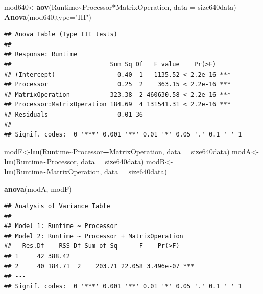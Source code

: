 \documentclass[
]{article}
\newenvironment{Shaded}{\begin{snugshade}}{\end{snugshade}}
\newcommand{\DataTypeTok}[1]{\textcolor[rgb]{0.13,0.29,0.53}{#1}}
\newcommand{\KeywordTok}[1]{\textcolor[rgb]{0.13,0.29,0.53}{\textbf{#1}}}
\newcommand{\NormalTok}[1]{#1}
\newcommand{\OperatorTok}[1]{\textcolor[rgb]{0.81,0.36,0.00}{\textbf{#1}}}
\newcommand{\StringTok}[1]{\textcolor[rgb]{0.31,0.60,0.02}{#1}}
\begin{document}
\begin{Shaded}
\begin{Highlighting}[]
\NormalTok{mod640\textless{}{-}}\KeywordTok{aov}\NormalTok{(Runtime}\OperatorTok{\textasciitilde{}}\NormalTok{Processor}\OperatorTok{*}\NormalTok{MatrixOperation, }\DataTypeTok{data =}\NormalTok{ size640data)}
\KeywordTok{Anova}\NormalTok{(mod640,}\DataTypeTok{type=}\StringTok{"III"}\NormalTok{)}
\end{Highlighting}
\end{Shaded}

\begin{verbatim}
## Anova Table (Type III tests)
## 
## Response: Runtime
##                           Sum Sq Df   F value    Pr(>F)    
## (Intercept)                 0.40  1   1135.52 < 2.2e-16 ***
## Processor                   0.25  2    363.15 < 2.2e-16 ***
## MatrixOperation           323.38  2 460630.58 < 2.2e-16 ***
## Processor:MatrixOperation 184.69  4 131541.31 < 2.2e-16 ***
## Residuals                   0.01 36                        
## ---
## Signif. codes:  0 '***' 0.001 '**' 0.01 '*' 0.05 '.' 0.1 ' ' 1
\end{verbatim}

\begin{Shaded}
\begin{Highlighting}[]
\NormalTok{modF\textless{}{-}}\KeywordTok{lm}\NormalTok{(Runtime}\OperatorTok{\textasciitilde{}}\NormalTok{Processor}\OperatorTok{+}\NormalTok{MatrixOperation, }\DataTypeTok{data =}\NormalTok{ size640data)}
\NormalTok{modA\textless{}{-}}\KeywordTok{lm}\NormalTok{(Runtime}\OperatorTok{\textasciitilde{}}\NormalTok{Processor, }\DataTypeTok{data =}\NormalTok{ size640data)}
\NormalTok{modB\textless{}{-}}\KeywordTok{lm}\NormalTok{(Runtime}\OperatorTok{\textasciitilde{}}\NormalTok{MatrixOperation, }\DataTypeTok{data =}\NormalTok{ size640data)}

\KeywordTok{anova}\NormalTok{(modA, modF)}
\end{Highlighting}
\end{Shaded}

\begin{verbatim}
## Analysis of Variance Table
## 
## Model 1: Runtime ~ Processor
## Model 2: Runtime ~ Processor + MatrixOperation
##   Res.Df    RSS Df Sum of Sq      F    Pr(>F)    
## 1     42 388.42                                  
## 2     40 184.71  2    203.71 22.058 3.496e-07 ***
## ---
## Signif. codes:  0 '***' 0.001 '**' 0.01 '*' 0.05 '.' 0.1 ' ' 1
\end{verbatim}
\end{document}
